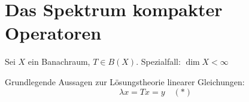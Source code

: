 
\section{Das Spektrum kompakter Operatoren}



Sei $X$ ein Banachraum, $T \in B(X)$. Spezialfall: $\dim X < \infty$

Grundlegende Aussagen zur Lösungstheorie linearer Gleichungen:
	\[ \lambda x = T x = y \quad (*) \label{eq:14.0-linereGleichung} \]



\newpage